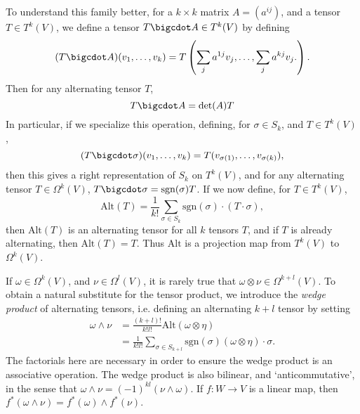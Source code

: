 To understand this family better, for a $k \times k$ matrix $A = ( a^{ij} )$, and a tensor $T \in T^k(V)$, we define a tensor $T \bigcdot A \in T^k(V)$ by defining
%
\[ (T \bigcdot A)(v_1,\dots, v_k) = T \left( \sum_j a^{1j} v_j, \dots, \sum_j a^{kj} v_j. \right). \]
%
Then for any alternating tensor $T$,
%
\[ T \bigcdot A = \det(A) T \]
%
In particular, if we specialize this operation, defining, for $\sigma \in S_k$, and $T \in T^k(V)$,
%
\[ (T \bigcdot \sigma)(v_1, \dots, v_k) = T( v_{\sigma(1)}, \dots, v_{\sigma(k)} ), \]
%
then this gives a right representation of $S_k$ on $T^k(V)$, and for any alternating tensor $T \in \Omega^k(V)$, $T \bigcdot \sigma = \text{sgn}(\sigma) T$. If we now define, for $T \in T^k(V)$,
%
\[ \text{Alt}(T) = \frac{1}{k!} \sum_{\sigma \in S_k} \text{sgn}(\sigma) \cdot (T \cdot \sigma), \]
%
then $\text{Alt}(T)$ is an alternating tensor for all $k$ tensors $T$, and if $T$ is already alternating, then $\text{Alt}(T) = T$. Thus $\text{Alt}$ is a projection map from $T^k(V)$ to $\Omega^k(V)$.

If $\omega \in \Omega^k(V)$, and $\nu \in \Omega^l(V)$, it is rarely true that $\omega \otimes \nu \in \Omega^{k+l}(V)$. To obtain a natural substitute for the tensor product, we introduce the \emph{wedge product} of alternating tensors, i.e. defining an alternating $k + l$ tensor by setting
%
\begin{align*}
    \omega \wedge \nu &= \frac{(k+l)!}{k! l!} \text{Alt}(\omega \otimes \eta)\\
    &= \frac{1}{k!l!} \sum_{\sigma \in S_{k+l}} \text{sgn}(\sigma) (\omega \otimes \eta) \cdot \sigma.
\end{align*}
%
The factorials here are necessary in order to ensure the wedge product is an associative operation. The wedge product is also bilinear, and `anticommutative', in the sense that $\omega \wedge \nu = (-1)^{kl} (\nu \wedge \omega)$. If $f: W \to V$ is a linear map, then $f^*(\omega \wedge \nu) = f^*(\omega) \wedge f^*(\nu)$.

